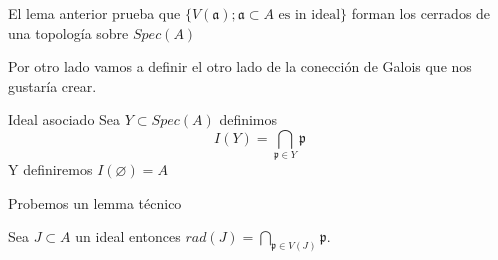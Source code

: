 \documentclass{article}
\begin{document}
\begin{observacion}{}{}
    El lema anterior prueba que $\{V(\mathfrak{a}); \mathfrak{a} \subset A \mbox{ es in ideal}\}$
    forman los cerrados de una topología sobre $Spec(A)$
\end{observacion}

Por otro lado vamos a definir el otro lado de la conección de 
Galois que nos gustaría crear.

\begin{definicion}{Ideal asociado}{}
    Sea $Y \subset Spec(A)$ definimos
    $$I(Y) = \bigcap_{\mathfrak{p}\in Y} \mathfrak{p}$$
    Y definiremos $I(\varnothing) = A$
\end{definicion}

Probemos un lemma técnico
\begin{lema}{}{}
    Sea $J \subset A$ un ideal entonces
    $rad(J) = \bigcap_{\mathfrak{p} \in V(J)} \mathfrak{p}$.
\end{lema}
\end{document}
